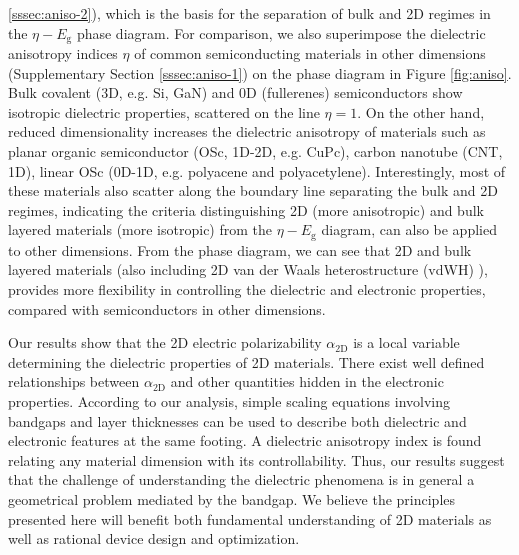 \documentclass[journal=ancac3,manuscript=article,email=true,hyperref=true,keywords=false]{achemso}
\begin{document}
\ref{sssec:aniso-2}), which is the basis for the separation of bulk
and 2D regimes in the $\eta-E_{\mathrm{g}}$ phase diagram.  For
comparison, we also superimpose the dielectric anisotropy indices
$\eta$ of common semiconducting materials in other dimensions 
(Supplementary Section \ref{sssec:aniso-1}) on the phase diagram in Figure
\ref{fig:aniso}. Bulk covalent (3D, e.g. Si, GaN) and 0D (fullerenes)
semiconductors show isotropic dielectric properties, scattered on the
line $\eta=1$. On the other hand, reduced dimensionality increases the
dielectric anisotropy of materials such as planar organic
semiconductor (OSc, 1D-2D, e.g. CuPc), carbon nanotube (CNT, 1D),
linear OSc (0D-1D, e.g. polyacene and polyacetylene). Interestingly,
most of these materials also scatter along the boundary line
separating the bulk and 2D regimes, indicating the criteria
distinguishing 2D (more anisotropic) and bulk layered materials (more
isotropic) from the $\eta-E_{\mathrm{g}}$ diagram, can also be applied
to other dimensions. From the phase diagram, we can see that 2D and
bulk layered materials (also including 2D van der Waals
heterostructure (vdWH) \cite{Novoselov_2016}), provides more
flexibility in controlling the dielectric and electronic properties,
compared with semiconductors in other dimensions.  

%



Our results show that the 2D electric polarizability
$\alpha_{\mathrm{2D}}$ is a local variable determining the dielectric
properties of 2D materials.  There exist well defined relationships
between $\alpha_{\mathrm{2D}}$ and other quantities hidden in the
electronic properties.  According to our analysis, simple scaling
equations involving bandgaps and layer thicknesses can be used to
describe both dielectric and electronic features at the same
footing. A dielectric anisotropy index is found relating any material
dimension with its controllability.  Thus, our results suggest that
the challenge of understanding the dielectric phenomena is in general
a geometrical problem mediated by the bandgap. We believe the
principles presented here will benefit both fundamental understanding
of 2D materials as well as rational device design and optimization.
\end{document}
